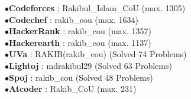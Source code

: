 

\begin{cvparagraph}

   
   $\bullet${\textbf{Codeforces} : Rakibul\_Islam\_CoU  (max. 1305)}
  \\ $\bullet${\textbf{Codechef} : rakib\_cou  (max. 1634)  }
  \\$\bullet${\textbf{HackerRank} : rakib\_cou  (max. 1357)  }
\\$\bullet${\textbf{Hackerearth} : rakib\_cou  (max. 1137)   }
\\$\bullet${\textbf{UVa} : RAKIB(rakib\_cou)  (Solved 74 Problems)   }
\\$\bullet${\textbf{Lightoj} : md\-rakibul29  (Solved 63 Problems)  }
\\$\bullet${\textbf{Spoj} : rakib\_cou (Solved 48 Problems)   }
\\$\bullet${\textbf{Atcoder} : Rakib\_CoU  (max. 231)  }
   
   
   
  

\end{cvparagraph}
